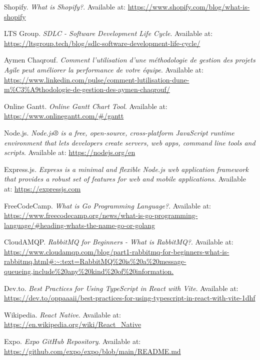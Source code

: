 \begin{thebibliography}{99}

    Shopify. \textit{What is Shopify?}. Available at: \url{https://www.shopify.com/blog/what-is-shopify}

    LTS Group. \textit{SDLC - Software Development Life Cycle}. Available at: \url{https://ltsgroup.tech/blog/sdlc-software-development-life-cycle/}

    Aymen Chaqrouf. \textit{Comment l'utilisation d'une méthodologie de gestion des projets Agile peut améliorer la performance de votre équipe}. Available at: \url{https://www.linkedin.com/pulse/comment-lutilisation-dune-m%C3%A9thodologie-de-gestion-des-aymen-chaqrouf/}

    Online Gantt. \textit{Online Gantt Chart Tool}. Available at: \url{https://www.onlinegantt.com/#/gantt}

    Node.js. \textit{Node.js® is a free, open-source, cross-platform JavaScript runtime environment that lets developers create servers, web apps, command line tools and scripts}. Available at: \url{https://nodejs.org/en}
        
    Express.js. \textit{Express is a minimal and flexible Node.js web application framework that provides a robust set of features for web and mobile applications}. Available at: \url{https://expressjs.com}
        
    FreeCodeCamp. \textit{What is Go Programming Language?}. Available at: \url{https://www.freecodecamp.org/news/what-is-go-programming-language/#heading-whats-the-name-go-or-golang}
        
    CloudAMQP. \textit{RabbitMQ for Beginners - What is RabbitMQ?}. Available at: \url{https://www.cloudamqp.com/blog/part1-rabbitmq-for-beginners-what-is-rabbitmq.html#:~:text=RabbitMQ%20is%20a%20message-queueing,include%20any%20kind%20of%20information.}
        
    Dev.to. \textit{Best Practices for Using TypeScript in React with Vite}. Available at: \url{https://dev.to/oppaaaii/best-practices-for-using-typescript-in-react-with-vite-1dhf}
        
    Wikipedia. \textit{React Native}. Available at: \url{https://en.wikipedia.org/wiki/React_Native}
        
    Expo. \textit{Expo GitHub Repository}. Available at: \url{https://github.com/expo/expo/blob/main/README.md}
        

\end{thebibliography}
